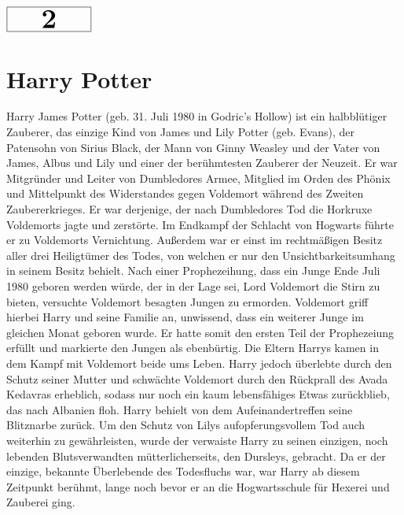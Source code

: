 \documentclass[a4paper, 10pt]{article}
\begin{document}
\begin{minipage}[t]{\textwidth}
    \vspace*{-1.5cm} %
    \begin{flushright}
        \hspace*{\fill} %
        $\boxed{\textbf{\Huge\phantom{00}2\phantom{00}}}$ %
    \end{flushright}
\end{minipage}
\section*{\huge Harry Potter}
Harry James Potter (geb. 31. Juli 1980 in Godric's Hollow) ist ein halbblütiger Zauberer, das einzige Kind von James und Lily Potter (geb. Evans), der Patensohn von Sirius Black, der Mann von Ginny Weasley und der Vater von James, Albus und Lily und einer der berühmtesten Zauberer der Neuzeit.
\vspace{10pt}
\newline
Er war Mitgründer und Leiter von Dumbledores Armee, Mitglied im Orden des Phönix und Mittelpunkt des Widerstandes gegen Voldemort während des Zweiten Zaubererkrieges. Er war derjenige, der nach Dumbledores Tod die Horkruxe Voldemorts jagte und zerstörte. Im Endkampf der Schlacht von Hogwarts führte er zu Voldemorts Vernichtung. Außerdem war er einst im rechtmäßigen Besitz aller drei Heiligtümer des Todes, von welchen er nur den Unsichtbarkeitsumhang in seinem Besitz behielt.
\vspace{10pt}
\newline
Nach einer Prophezeihung, dass ein Junge Ende Juli 1980 geboren werden würde, der in der Lage sei, Lord Voldemort die Stirn zu bieten, versuchte Voldemort besagten Jungen zu ermorden. Voldemort griff hierbei Harry und seine Familie an, unwissend, dass ein weiterer Junge im gleichen Monat geboren wurde. Er hatte somit den ersten Teil der Prophezeiung erfüllt und markierte den Jungen als ebenbürtig. Die Eltern Harrys kamen in dem Kampf mit Voldemort beide ums Leben. Harry jedoch überlebte durch den Schutz seiner Mutter und schwächte Voldemort durch den Rückprall des Avada Kedavras erheblich, sodass nur noch ein kaum lebensfähiges Etwas zurückblieb, das nach Albanien floh.
\vspace{10pt}
\newline
Harry behielt von dem Aufeinandertreffen seine Blitznarbe zurück. Um den Schutz von Lilys aufopferungsvollem Tod auch weiterhin zu gewährleisten, wurde der verwaiste Harry zu seinen einzigen, noch lebenden Blutsverwandten mütterlicherseits, den Dursleys, gebracht. Da er der einzige, bekannte Überlebende des Todesfluchs war, war Harry ab diesem Zeitpunkt berühmt, lange noch bevor er an die Hogwartsschule für Hexerei und Zauberei ging.
\end{document}
